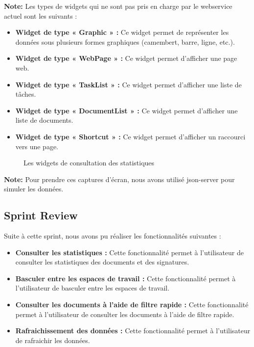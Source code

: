 \textbf{Note:} Les types de widgets qui ne sont pas pris en charge par le webservice actuel sont les suivants :
\begin{itemize}
  \item \textbf{Widget de type « Graphic » :} Ce widget permet de représenter les données sous plusieurs formes graphiques (camembert, barre, ligne, etc.).
  \item \textbf{Widget de type « WebPage » :} Ce widget permet d'afficher une page web.
  \item \textbf{Widget de type « TaskList » :} Ce widget permet d'afficher une liste de tâches.
  \item \textbf{Widget de type « DocumentList » :} Ce widget permet d'afficher une liste de documents.
  \item \textbf{Widget de type « Shortcut » :} Ce widget permet d'afficher un raccourci vers une page.
  \end{itemize}

\begin{figure}[H]
  \centering
  \caption{Les widgets de consultation des statistiques}
  \label{fig:capture_widgets}
\end{figure}

\textbf{Note:} Pour prendre ces captures d'écran, nous avons utilisé json-server pour simuler les données.\\
  



\subsection{Sprint Review}
Suite à cette sprint, nous avons pu réaliser les fonctionnalités suivantes :
\begin{itemize}
  \item \textbf{Consulter les statistiques :} Cette fonctionnalité permet à l'utilisateur de consulter les statistiques des documents et des signatures.
  \item \textbf{Basculer entre les espaces de travail :} Cette fonctionnalité permet à l'utilisateur de basculer entre les espaces de travail.
  \item \textbf{Consulter les documents à l'aide de filtre rapide :} Cette fonctionnalité permet à l'utilisateur de consulter les documents à l'aide de filtre rapide.
  \item \textbf{Rafraichissement des données :} Cette fonctionnalité permet à l'utilisateur de rafraichir les données.
\end{itemize}

